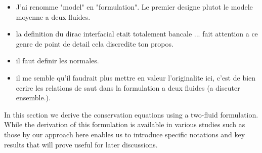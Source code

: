 \color{blue}
\begin{itemize}
\item J'ai renomme "model" en "formulation". Le premier designe plutot le modele moyenne a deux fluides.
\item la definition du dirac interfacial etait totalement bancale ... fait attention a ce genre de point de detail cela discredite ton propos.
\item il faut definir les normales.
\item il me semble qu'il faudrait plus mettre en valeur l'originalite ici, c'est de bien ecrire les relations de saut dans la formulation a deux fluides (a discuter ensemble.).
\end{itemize}
\color{black}
In this section we derive the conservation equations using a two-fluid formulation.%
While the derivation of this formulation is available in various studies such as those by \citet{kataoka1986local,lhuillier2010multiphase,ishii2010thermo,morel2015mathematical} our approach here enables us to introduce specific notations and key results that will prove useful for later discussions. %
